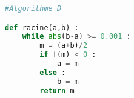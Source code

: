\begin{lstlisting}[language=python]
#Algorithme D

def racine(a,b) :
	while abs(b-a) >= 0.001 :
		m = (a+b)/2
		if f(m) < 0 :
			a = m
		else :
			b = m
		return m
\end{lstlisting}